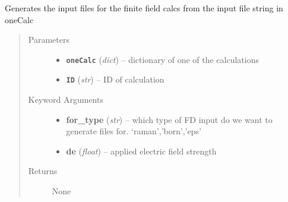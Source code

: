 \documentclass[letterpaper,10pt,english]{sphinxmanual}
\begin{document}
\begin{fulllineitems}
\label{run:run.__gen_fd_input}
Generates the input files for the finite field calcs from the input file string in oneCalc
\begin{quote}\begin{description}
\item[{Parameters}] \leavevmode\begin{itemize}
\item {} 
\textbf{\texttt{oneCalc}} (\emph{dict}) -- dictionary of one of the calculations

\item {} 
\textbf{\texttt{ID}} (\emph{str}) -- ID of calculation

\end{itemize}

\item[{Keyword Arguments}] \leavevmode\begin{itemize}
\item {} 
\textbf{for\_type} (\emph{str}) --
which type of FD input do we want to generate files for. `raman','born','eps'

\item {} 
\textbf{de} (\emph{float}) --
applied electric field strength

\end{itemize}

\item[{Returns}] \leavevmode
None

\end{description}\end{quote}

\end{fulllineitems}

\end{document}
